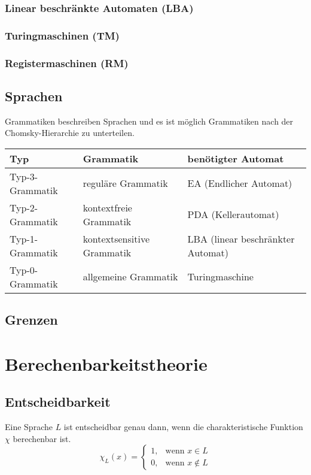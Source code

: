 \documentclass{article}
\begin{document}
\subsubsection{Linear beschränkte Automaten (LBA)}

\subsubsection{Turingmaschinen (TM)}
\subsubsection{Registermaschinen (RM)}
\subsection{Sprachen}
Grammatiken beschreiben Sprachen und es ist möglich Grammatiken nach der Chomsky-Hierarchie zu unterteilen.\\
\begin{tabular}{l | l | l}
    Typ         & Grammatik       &  benötigter Automat               \\\hline
    Typ-3-Grammatik     & reguläre Grammatik            & EA (Endlicher Automat)            \\
    Typ-2-Grammatik     & kontextfreie Grammatik        & PDA (Kellerautomat)               \\
    Typ-1-Grammatik     & kontextsensitive Grammatik    & LBA (linear beschränkter Automat) \\
    Typ-0-Grammatik     & allgemeine Grammatik          & Turingmaschine          \\
\end{tabular}
\subsection{Grenzen}
\section{Berechenbarkeitstheorie}
\subsection{Entscheidbarkeit}
Eine Sprache $L$ ist entscheidbar genau dann, wenn die charakteristische Funktion $\chi$ berechenbar ist.
\begin{equation}
    \chi _L(x)=
    \begin{cases}
        1, & \text{wenn } x\in L     \\
        0, & \text{wenn } x\not\in L
    \end{cases}
\end{equation}
\end{document}
